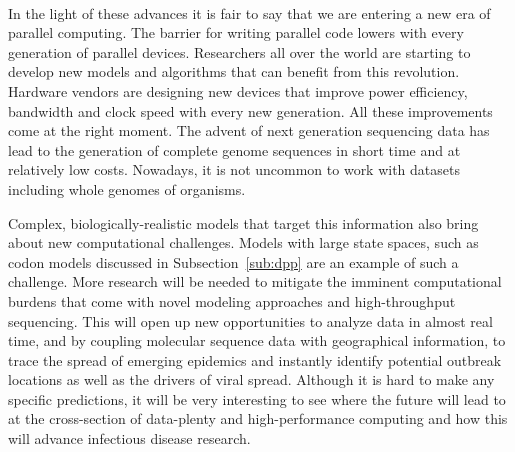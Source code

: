 \paragraph{}
In the light of these advances it is fair to say that we are entering a new era of parallel computing.
The barrier for writing parallel code lowers with every generation of parallel devices.
Researchers all over the world are starting to develop new models and algorithms that can benefit from this revolution.
Hardware vendors are designing new devices that improve power efficiency, bandwidth and clock speed with every new generation.
All these improvements come at the right moment.
The advent of next generation sequencing data has lead to the generation of complete genome sequences in short time and at relatively low costs.
Nowadays, it is not uncommon to work with datasets including whole genomes of organisms.

Complex, biologically-realistic models that target this information also bring about new computational challenges.
Models with large state spaces, such as codon models discussed in Subsection~\ref{sub:dpp} are an example of such a challenge.
More research will be needed to mitigate the imminent computational burdens that come with novel modeling approaches and high-throughput sequencing. 
This will open up new opportunities to analyze data in almost real time, and by coupling molecular sequence data with geographical information, to trace the spread of emerging epidemics and instantly identify potential outbreak locations as well as the drivers of viral spread.  
Although it is hard to make any specific predictions, it will be very interesting to see where the future will lead to at the cross-section of data-plenty and high-performance computing and how this will advance infectious disease research.
















